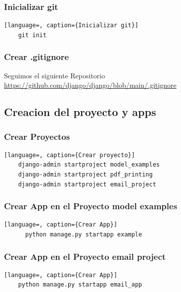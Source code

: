 \documentclass{article}
\begin{document}

  \subsubsection{Inicializar git}
  \begin{lstlisting}[language=, caption={Inicializar git}]
    git init
  \end{lstlisting}
  

  \subsubsection{Crear .gitignore}
  Seguimos el siguiente Repositorio \url{https://github.com/django/django/blob/main/.gitignore}
  
  
  \subsection{Creacion del proyecto y apps}
  

  \subsubsection{Crear Proyectos}
  \begin{lstlisting}[language=, caption={Crear proyecto}]
    django-admin startproject model_examples
    django-admin startproject pdf_printing
    django-admin startproject email_project
  \end{lstlisting}
  

  \subsubsection{Crear App en el Proyecto model examples}
    \begin{lstlisting}[language=, caption={Crear App}]
      python manage.py startapp example
    \end{lstlisting}
  

  \subsubsection{Crear App en el Proyecto email project}
  \begin{lstlisting}[language=, caption={Crear App}]
    python manage.py startapp email_app
  \end{lstlisting}
  
\end{document}
